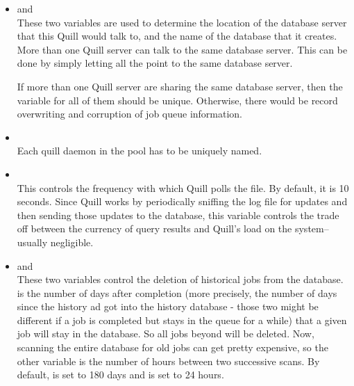 \begin{itemize}

\item {} and \\
These two variables are used to determine the location of the database
server that this Quill would talk to, and the name of the database that
it creates.  More than one Quill server can talk to the same database
server.  This can be done by simply letting all the 
 point to the same database server.

If more than one Quill server are sharing the same database
server, then the  variable for all of them should
be unique.  Otherwise, there would be record overwriting and corruption
of job queue information.

\item {}\\
Each quill daemon in the pool has to be uniquely named.

\item {}\\
This controls the frequency with which Quill polls the
 file.  By default, it is 10 seconds.  Since Quill
works by periodically sniffing the log file for updates and then sending
those updates to the database, this variable controls the trade off between
the currency of query results and Quill's load on the system--usually
negligible.

\item {} and 
		\\
These two variables control the deletion of historical jobs from the
database.   is the number of days
after completion (more precisely, the number of days since the history ad got 
into the history database - those two might be different if a job is completed 
but stays in the queue for a while) that a given job will stay in the database.  
So all jobs beyond  will be deleted.  Now,
scanning the entire database for old jobs can get pretty expensive,
so the other variable 
is the number of hours between two successive scans.  By default,
 is set to 180 days and
 is set to 24 hours.


\end{itemize}
